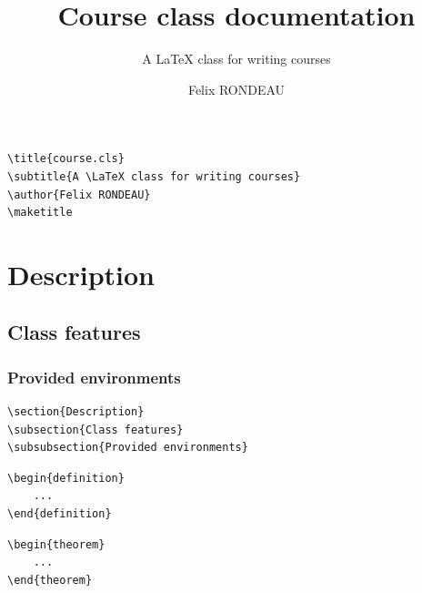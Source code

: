 \documentclass{course}
\title{Course class documentation}
\subtitle{A \LaTeX\hspace{0.1em} class for writing courses}
\author{Felix RONDEAU}
\theoremstyle{unnumbered}
\begin{document}
\maketitle
\begin{lstlisting}
\title{course.cls}
\subtitle{A \LaTeX class for writing courses}
\author{Felix RONDEAU}
\maketitle
\end{lstlisting}

\section{Description}
\subsection{Class features}
\subsubsection{Provided environments}
\begin{lstlisting}
\section{Description}
\subsection{Class features}
\subsubsection{Provided environments}
\end{lstlisting}

\begin{definition}
	\begin{lstlisting}
\begin{definition}
	...
\end{definition}
\end{lstlisting}
\end{definition}

\begin{theorem}
	\begin{lstlisting}
\begin{theorem}
	...
\end{theorem}
\end{lstlisting}
\end{theorem}
\end{document}
